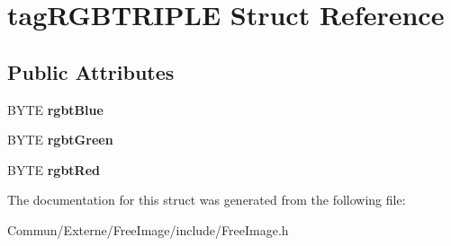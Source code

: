 \hypertarget{structtag_r_g_b_t_r_i_p_l_e}{}\section{tag\+R\+G\+B\+T\+R\+I\+P\+LE Struct Reference}
\label{structtag_r_g_b_t_r_i_p_l_e}
\subsection*{Public Attributes}
\begin{DoxyCompactItemize}
\item 
B\+Y\+TE {\bfseries rgbt\+Blue}\hypertarget{structtag_r_g_b_t_r_i_p_l_e_adbebf9e7802cdfffbdae31c08a71dab7}{}\label{structtag_r_g_b_t_r_i_p_l_e_adbebf9e7802cdfffbdae31c08a71dab7}

\item 
B\+Y\+TE {\bfseries rgbt\+Green}\hypertarget{structtag_r_g_b_t_r_i_p_l_e_a2e3e106422819352693de65189cc341f}{}\label{structtag_r_g_b_t_r_i_p_l_e_a2e3e106422819352693de65189cc341f}

\item 
B\+Y\+TE {\bfseries rgbt\+Red}\hypertarget{structtag_r_g_b_t_r_i_p_l_e_ae61b0771fd3e1e267a3495dcfba5e21c}{}\label{structtag_r_g_b_t_r_i_p_l_e_ae61b0771fd3e1e267a3495dcfba5e21c}

\end{DoxyCompactItemize}


The documentation for this struct was generated from the following file\+:\begin{DoxyCompactItemize}
\item 
Commun/\+Externe/\+Free\+Image/include/Free\+Image.\+h\end{DoxyCompactItemize}
